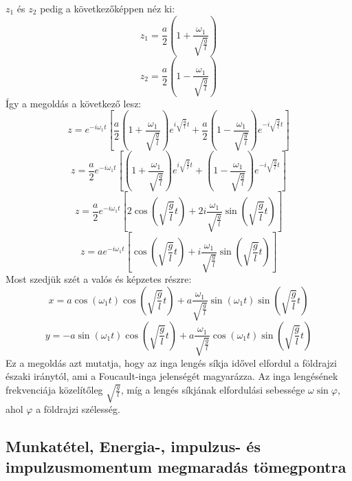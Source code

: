 \documentclass[a4paper,12pt]{article}
\begin{document}
$z_1$ és $z_2$ pedig a következőképpen néz ki:
\begin{equation}
    z_1 = \frac{a}{2}\left(1 + \frac{\omega_1}{\sqrt{\frac{g}{l}}}\right)
\end{equation}
\begin{equation}
    z_2 = \frac{a}{2}\left(1 - \frac{\omega_1}{\sqrt{\frac{g}{l}}}\right)
\end{equation}
Így a megoldás a következő lesz:
\begin{equation}
    z = e^{-i\omega_1 t} \left[\frac{a}{2}\left(1 + \frac{\omega_1}{\sqrt{\frac{g}{l}}}\right) e^{i\sqrt{\frac{g}{l}}t} + \frac{a}{2}\left(1 - \frac{\omega_1}{\sqrt{\frac{g}{l}}}\right) e^{-i\sqrt{\frac{g}{l}}t}\right]
\end{equation}
\begin{equation}
    z = \frac{a}{2} e^{-i\omega_1 t} \left[\left(1 + \frac{\omega_1}{\sqrt{\frac{g}{l}}}\right) e^{i\sqrt{\frac{g}{l}}t} + \left(1 - \frac{\omega_1}{\sqrt{\frac{g}{l}}}\right) e^{-i\sqrt{\frac{g}{l}}t}\right]
\end{equation}
\begin{equation}
    z = \frac{a}{2} e^{-i\omega_1 t} \left[2\cos\left(\sqrt{\frac{g}{l}}t\right) + 2i\frac{\omega_1}{\sqrt{\frac{g}{l}}}\sin\left(\sqrt{\frac{g}{l}}t\right)\right]
\end{equation}
\begin{equation}
    z = a e^{-i\omega_1 t} \left[\cos\left(\sqrt{\frac{g}{l}}t\right) + i\frac{\omega_1}{\sqrt{\frac{g}{l}}}\sin\left(\sqrt{\frac{g}{l}}t\right)\right]
\end{equation}
Most szedjük szét a valós és képzetes részre:
\begin{equation}
    x = a \cos(\omega_1 t) \cos\left(\sqrt{\frac{g}{l}}t\right) + a \frac{\omega_1}{\sqrt{\frac{g}{l}}} \sin(\omega_1 t) \sin\left(\sqrt{\frac{g}{l}}t\right)
\end{equation}
\begin{equation}
    y = -a \sin(\omega_1 t) \cos\left(\sqrt{\frac{g}{l}}t\right) + a \frac{\omega_1}{\sqrt{\frac{g}{l}}} \cos(\omega_1 t) \sin\left(\sqrt{\frac{g}{l}}t\right)
\end{equation}
Ez a megoldás azt mutatja, hogy az inga lengés síkja idővel elfordul a földrajzi északi iránytól, ami a Foucault-inga jelenségét magyarázza. Az inga lengésének frekvenciája közelítőleg $\sqrt{\frac{g}{l}}$, míg a lengés síkjának elfordulási sebessége $\omega \sin \varphi$, ahol $\varphi$ a földrajzi szélesség. 

\subsection{Munkatétel, Energia-, impulzus- és impulzusmomentum megmaradás tömegpontra}
\end{document}
